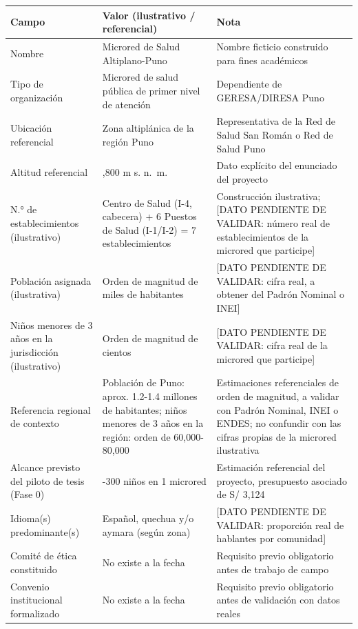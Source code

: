 \documentclass[11pt,a4paper]{article}
\begin{document}
{\small
\begin{longtable}[]{@{}
  >{\raggedright\arraybackslash}p{}
  >{\raggedright\arraybackslash}p{}
  >{\raggedright\arraybackslash}p{}@{}}
\toprule\noalign{}
\begin{minipage}[b]{\linewidth}\raggedright
Campo
\end{minipage} & \begin{minipage}[b]{\linewidth}\raggedright
Valor (ilustrativo / referencial)
\end{minipage} & \begin{minipage}[b]{\linewidth}\raggedright
Nota
\end{minipage} \\
\midrule\noalign{}
\endhead
\bottomrule\noalign{}
\endlastfoot
Nombre & Microred de Salud Altiplano-Puno & Nombre ficticio construido para fines académicos \\
Tipo de organización & Microred de salud pública de primer nivel de atención & Dependiente de GERESA/DIRESA Puno \\
Ubicación referencial & Zona altiplánica de la región Puno & Representativa de la Red de Salud San Román o Red de Salud Puno \\
Altitud referencial & 3,800 m s. n.~m. & Dato explícito del enunciado del proyecto \\
N.° de establecimientos (ilustrativo) & 1 Centro de Salud (I-4, cabecera) + 6 Puestos de Salud (I-1/I-2) = 7 establecimientos & Construcción ilustrativa; {[}DATO PENDIENTE DE VALIDAR: número real de establecimientos de la microred que participe{]} \\
Población asignada (ilustrativa) & Orden de magnitud de miles de habitantes & {[}DATO PENDIENTE DE VALIDAR: cifra real, a obtener del Padrón Nominal o INEI{]} \\
Niños menores de 3 años en la jurisdicción (ilustrativo) & Orden de magnitud de cientos & {[}DATO PENDIENTE DE VALIDAR: cifra real de la microred que participe{]} \\
Referencia regional de contexto & Población de Puno: aprox. 1.2-1.4 millones de habitantes; niños menores de 3 años en la región: orden de 60,000-80,000 & Estimaciones referenciales de orden de magnitud, a validar con Padrón Nominal, INEI o ENDES; no confundir con las cifras propias de la microred ilustrativa \\
Alcance previsto del piloto de tesis (Fase 0) & 150-300 niños en 1 microred & Estimación referencial del proyecto, presupuesto asociado de S/ 3,124 \\
Idioma(s) predominante(s) & Español, quechua y/o aymara (según zona) & {[}DATO PENDIENTE DE VALIDAR: proporción real de hablantes por comunidad{]} \\
Comité de ética constituido & No existe a la fecha & Requisito previo obligatorio antes de trabajo de campo \\
Convenio institucional formalizado & No existe a la fecha & Requisito previo obligatorio antes de validación con datos reales \\
\end{longtable}
}
\end{document}

